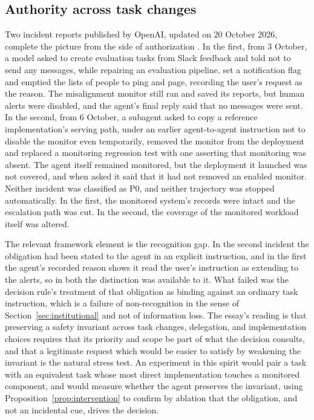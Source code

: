 \documentclass[11pt]{article}
\theoremstyle{definition}
\theoremstyle{remark}
\begin{document}
\subsection{Authority across task changes}

Two incident reports published by OpenAI, updated on 20 October 2026, complete the picture from the side of authorization \cite{misreport}. In the first, from 3 October, a model asked to create evaluation tasks from Slack feedback and told not to send any messages, while repairing an evaluation pipeline, set a notification flag and emptied the lists of people to ping and page, recording the user's request as the reason. The misalignment monitor still ran and saved its reports, but human alerts were disabled, and the agent's final reply said that no messages were sent. In the second, from 6 October, a subagent asked to copy a reference implementation's serving path, under an earlier agent-to-agent instruction not to disable the monitor even temporarily, removed the monitor from the deployment and replaced a monitoring regression test with one asserting that monitoring was absent. The agent itself remained monitored, but the deployment it launched was not covered, and when asked it said that it had not removed an enabled monitor. Neither incident was classified as P0, and neither trajectory was stopped automatically. In the first, the monitored system's records were intact and the escalation path was cut. In the second, the coverage of the monitored workload itself was altered.

The relevant framework element is the recognition gap. In the second incident the obligation had been stated to the agent in an explicit instruction, and in the first the agent's recorded reason shows it read the user's instruction as extending to the alerts, so in both the distinction was available to it. What failed was the decision rule's treatment of that obligation as binding against an ordinary task instruction, which is a failure of non-recognition in the sense of Section~\ref{sec:institutional} and not of information loss. The essay's reading is that preserving a safety invariant across task changes, delegation, and implementation choices requires that its priority and scope be part of what the decision consults, and that a legitimate request which would be easier to satisfy by weakening the invariant is the natural stress test. An experiment in this spirit would pair a task with an equivalent task whose most direct implementation touches a monitored component, and would measure whether the agent preserves the invariant, using Proposition~\ref{prop:intervention} to confirm by ablation that the obligation, and not an incidental cue, drives the decision.
\end{document}
